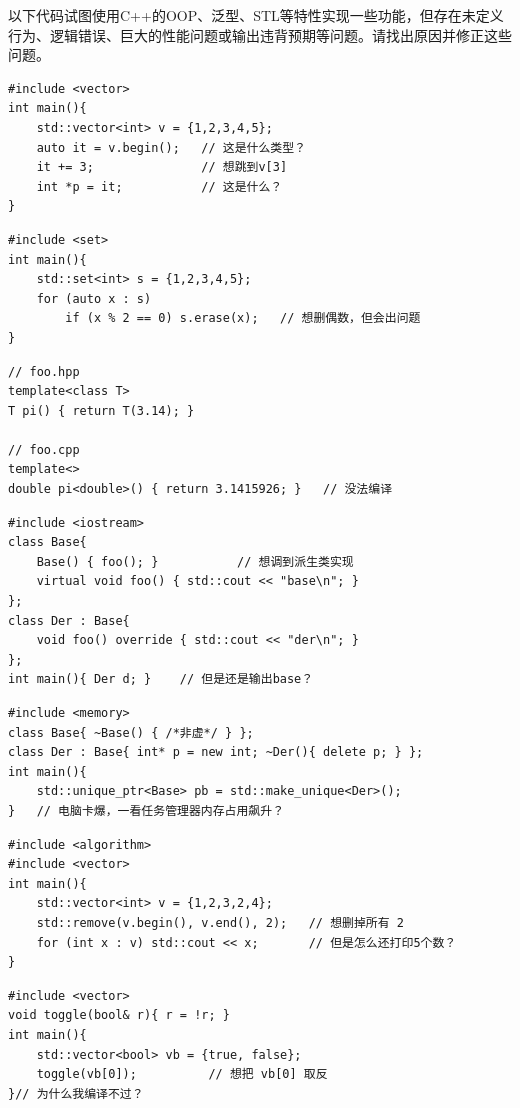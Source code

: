 \begin{exercise}[改错题]
以下代码试图使用C++的OOP、泛型、STL等特性实现一些功能，但存在未定义行为、逻辑错误、巨大的性能问题或输出违背预期等问题。请找出原因并修正这些问题。
\begin{verbatim}
#include <vector>
int main(){
    std::vector<int> v = {1,2,3,4,5};
    auto it = v.begin();   // 这是什么类型？
    it += 3;               // 想跳到v[3]
    int *p = it;           // 这是什么？
}
\end{verbatim}

\begin{verbatim}
#include <set>
int main(){
    std::set<int> s = {1,2,3,4,5};
    for (auto x : s)
        if (x % 2 == 0) s.erase(x);   // 想删偶数，但会出问题
}
\end{verbatim}

\begin{verbatim}
// foo.hpp
template<class T>
T pi() { return T(3.14); }

// foo.cpp
template<>
double pi<double>() { return 3.1415926; }   // 没法编译
\end{verbatim}

\begin{verbatim}
#include <iostream>
class Base{
    Base() { foo(); }           // 想调到派生类实现
    virtual void foo() { std::cout << "base\n"; }
};
class Der : Base{
    void foo() override { std::cout << "der\n"; }
};
int main(){ Der d; }    // 但是还是输出base？
\end{verbatim}

\begin{verbatim}
#include <memory>
class Base{ ~Base() { /*非虚*/ } };
class Der : Base{ int* p = new int; ~Der(){ delete p; } };
int main(){
    std::unique_ptr<Base> pb = std::make_unique<Der>();
}   // 电脑卡爆，一看任务管理器内存占用飙升？
\end{verbatim}

\begin{verbatim}
#include <algorithm>
#include <vector>
int main(){
    std::vector<int> v = {1,2,3,2,4};
    std::remove(v.begin(), v.end(), 2);   // 想删掉所有 2
    for (int x : v) std::cout << x;       // 但是怎么还打印5个数？
}
\end{verbatim}

\begin{verbatim}
#include <vector>
void toggle(bool& r){ r = !r; }
int main(){
    std::vector<bool> vb = {true, false};
    toggle(vb[0]);          // 想把 vb[0] 取反
}// 为什么我编译不过？
\end{verbatim}
\end{exercise}


